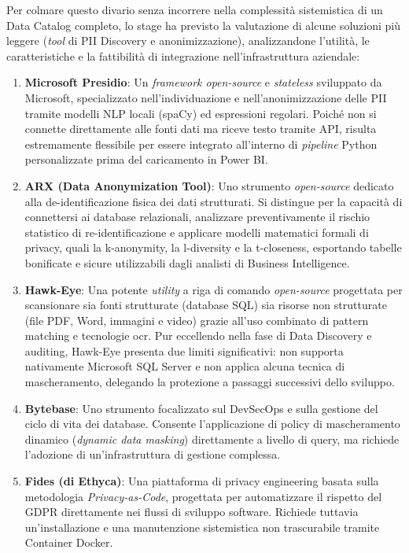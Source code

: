Per colmare questo divario senza incorrere nella complessità sistemistica di un Data Catalog completo, lo stage ha previsto la valutazione di alcune soluzioni più leggere 
(\emph{tool} di PII Discovery e anonimizzazione), analizzandone l'utilità, le caratteristiche e la fattibilità di integrazione nell'infrastruttura aziendale:
\begin{enumerate}
    \item \textbf{Microsoft Presidio}: Un \emph{framework open-source} e \emph{stateless} sviluppato da Microsoft, specializzato nell'individuazione e nell'anonimizzazione delle PII tramite modelli NLP locali (spaCy) ed espressioni regolari. Poiché non si connette direttamente alle fonti dati ma riceve testo tramite API, risulta estremamente flessibile per essere integrato all'interno di \emph{pipeline} Python personalizzate prima del caricamento in Power BI.
    \item \textbf{ARX (Data Anonymization Tool)}: Uno strumento \emph{open-source} dedicato alla de-identificazione fisica dei dati strutturati. Si distingue per la capacità di connettersi ai database relazionali, analizzare preventivamente il rischio statistico di re-identificazione e applicare modelli matematici formali di privacy, quali la \gls{k-anonymity}, la \gls{l-diversity} e la \gls{t-closeness}, esportando tabelle bonificate e sicure utilizzabili dagli analisti di Business Intelligence.
    \item \textbf{Hawk-Eye}: Una potente \emph{utility} a riga di comando \emph{open-source} progettata per scansionare sia fonti strutturate (database SQL) sia risorse non strutturate (file PDF, Word, immagini e video) grazie all'uso combinato di pattern matching e tecnologie \gls{ocr}. Pur eccellendo nella fase di Data Discovery e auditing, Hawk-Eye presenta due limiti significativi: non supporta nativamente Microsoft SQL Server e non applica alcuna tecnica di mascheramento, delegando la protezione a passaggi successivi dello sviluppo.
    \item \textbf{Bytebase}: Uno strumento focalizzato sul DevSecOps e sulla gestione del ciclo di vita dei database. Consente l'applicazione di policy di mascheramento dinamico (\emph{dynamic data masking}) direttamente a livello di query, ma richiede l'adozione di un'infrastruttura di gestione complessa.
    \item \textbf{Fides (di Ethyca)}: Una piattaforma di privacy engineering basata sulla metodologia \emph{Privacy-as-Code}, progettata per automatizzare il rispetto del GDPR direttamente nei flussi di sviluppo software. Richiede tuttavia un'installazione e una manutenzione sistemistica non trascurabile tramite Container Docker.
\end{enumerate}

